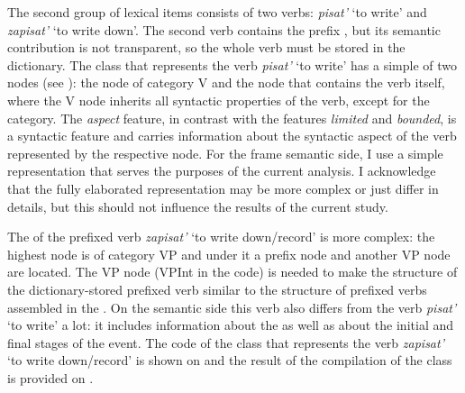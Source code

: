The second group of lexical items consists of two verbs: \textit{pisat'} `to write' and \textit{zapisat'} `to write down'. The second verb contains the prefix , but its semantic contribution is not transparent, so the whole verb must be stored in the dictionary. The class that represents the verb \textit{pisat'} `to write' has a simple  of two nodes (see ): the node of category V and the node that contains the verb itself, where the V node inherits all syntactic properties of the verb, except for the category. The \textit{aspect} feature, in contrast with the features \textit{limited} and \textit{bounded}, is a syntactic feature and carries information about the syntactic aspect of the verb represented by the respective node. For the frame semantic side, I use a simple representation that serves the purposes of the current analysis. I acknowledge that the fully elaborated representation may be more complex or just differ in details, but this should not influence the results of the current study.


The  of the prefixed verb \textit{zapisat'} `to write down/record' is more complex: the highest node is of category VP and under it a prefix node and another VP node are located. The  VP node (VPInt in the code) is needed to make the structure of the dictionary-stored prefixed verb similar to the structure of prefixed verbs assembled in the . On the semantic side this verb also differs from the verb \textit{pisat'} `to write' a lot: it includes information about the  as well as about the initial and final stages of the event. The  code of the class that represents the verb \textit{zapisat'} `to write down/record' is shown on  and the result of the compilation of the class is provided on .
 
